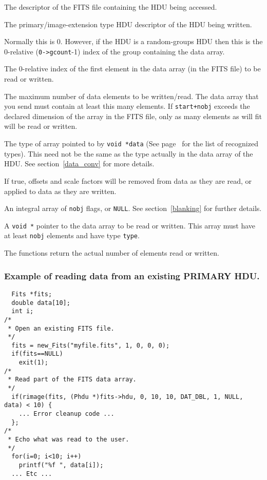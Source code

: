 \begin{arglist}

 The descriptor of the FITS file containing the HDU being
             accessed.
 
 The primary/image-extension type HDU descriptor of the
             HDU being written.

 Normally this is 0. However, if the HDU is a
             random-groups HDU then this is the 0-relative
	     (\verb`0->gcount`-1) index of the group containing the data
             array. 
 
 The 0-relative index of the first element in the
             data array (in the FITS file) to be read or written.

 The maximum number of data elements to be written/read.
             The data array that you send must contain at least this
             many elements. If \verb`start+nobj` exceeds the declared
             dimension of the array in the FITS file, only as many
             elements as will fit will be read or written.

 The type of array pointed to by \verb`void *data`
             (See page~\pageref{Fittype} for the list of
             recognized types). This need not
             be the same as the type actually in the data array of the
             HDU. See section~\ref{data_conv} for more details.

 If true, offsets and scale factors will be removed from
             data as they are read, or applied to data as they are written.

 An integral array of \verb`nobj` flags, or \verb`NULL`. See
             section~\ref{blanking} for further details.

 A \verb`void *` pointer to the data array to be
             read or written. This array must have at least
             \verb`nobj` elements and have type \verb`type`.
\end{arglist}

The functions return the actual number of elements read or written.

\subsubsection{Example of reading data from an existing PRIMARY HDU.}
\begin{verbatim}
  Fits *fits;
  double data[10];
  int i;
/*
 * Open an existing FITS file.
 */
  fits = new_Fits("myfile.fits", 1, 0, 0, 0);
  if(fits==NULL)
    exit(1);
/*
 * Read part of the FITS data array.
 */
  if(rimage(fits, (Phdu *)fits->hdu, 0, 10, 10, DAT_DBL, 1, NULL, data) < 10) {
    ... Error cleanup code ...
  };
/*
 * Echo what was read to the user.
 */
  for(i=0; i<10; i++)
    printf("%f ", data[i]);
  ... Etc ...
\end{verbatim}

